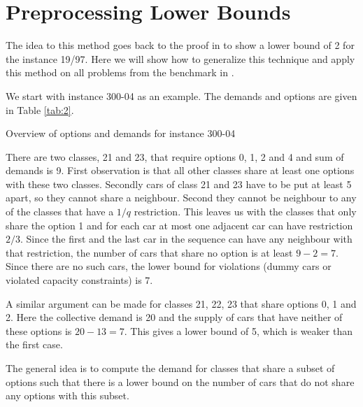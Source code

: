 \documentclass[]{llncs}
\begin{document}
\section{Preprocessing Lower Bounds}

The idea to this method goes back to the proof in \cite{Gent98} to show a lower bound of 2 for the instance 19/97. Here
we will show how to generalize this technique and apply this method on all problems from the benchmark in \cite{Gravel05}. 

We start with instance 300-04 as an example. The demands and options are given in Table \ref{tab:2}. 

\begin{table}[htbp]
    \caption{Overview of options and demands for instance 300-04}
    \centering
    
    \label{tab:2}
\end{table}

There are two classes, 21 and 23, that require options 0, 1, 2 and 4 and sum of demands is 9. First observation is that
all other classes share at least one options with these two classes.  Secondly cars of class 21 and 23 have to be put at
least 5 apart, so they cannot share a neighbour.  Second they cannot be neighbour to any of the classes that have a
$1/q$ restriction. This leaves us with the classes that only share the option 1 and for each car at most one adjacent
car can have restriction $2/3$. Since the first and the last car in the sequence can have any neighbour with that
restriction, the number of cars that share no option is at least $9-2=7$. Since there are no such cars, the lower bound
for violations (dummy cars or violated capacity constraints) is 7. 

A similar argument can be made for classes 21, 22, 23 that share options 0, 1 and 2. Here the collective demand is 20
and the supply of cars that have neither of these options is $20 - 13 = 7$. This gives a lower bound of 5, which is weaker than the
first case. 

The general idea is to compute the demand for classes that share a subset of options such that there is a lower bound on
the number of cars that do not share any options with this subset.
\end{document}
